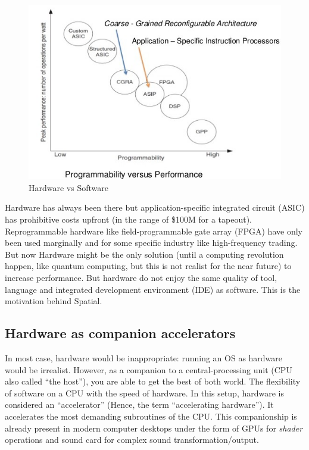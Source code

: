 \documentclass[12pt,]{article}
\begin{document}
\begin{figure}
\centering
\includegraphics{hwsf.jpg}
\caption{Hardware vs Software}
\end{figure}

Hardware has always been there but application-specific integrated
circuit (ASIC) has prohibitive costs upfront (in the range of \$100M for
a tapeout). Reprogrammable hardware like field-programmable gate array
(FPGA) have only been used marginally and for some specific industry
like high-frequency trading. But now Hardware might be the only solution
(until a computing revolution happen, like quantum computing, but this
is not realist for the near future) to increase performance. But
hardware do not enjoy the same quality of tool, language and integrated
development environment (IDE) as software. This is the motivation behind
Spatial.

\subsection{Hardware as companion
accelerators}\label{hardware-as-companion-accelerators}

In most case, hardware would be inappropriate: running an OS as hardware
would be irrealist. However, as a companion to a central-processing unit
(CPU also called ``the host''), you are able to get the best of both
world. The flexibility of software on a CPU with the speed of hardware.
In this setup, hardware is considered an ``accelerator'' (Hence, the
term ``accelerating hardware''). It accelerates the most demanding
subroutines of the CPU. This companionship is already present in modern
computer desktops under the form of GPUs for \emph{shader} operations
and sound card for complex sound transformation/output.
\end{document}
